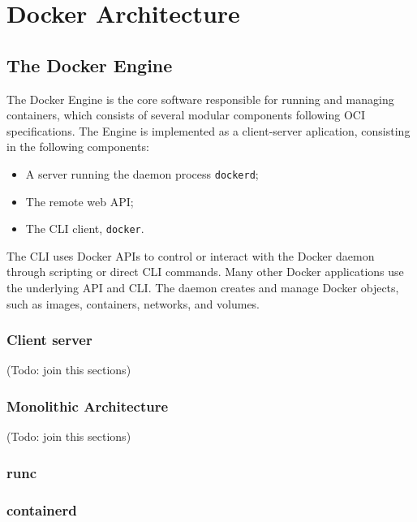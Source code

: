 \section{Docker Architecture}
\label{sec::arch}


\subsection{The Docker Engine}
\label{sec::arch:engine}
The Docker Engine is the core software responsible for running and managing containers, which consists of several modular components following \ac{OCI} specifications. The Engine is implemented as a client-server aplication, consisting in the following components:

\begin{itemize}
    \item A server running the daemon process \texttt{dockerd};
    \item The remote web \ac{API};
    \item The \ac{CLI} client, \texttt{docker}.
\end{itemize}



The CLI uses Docker APIs to control or interact with the Docker daemon through scripting or direct CLI commands. Many other Docker applications use the underlying API and CLI. The daemon creates and manage Docker objects, such as images, containers, networks, and volumes.

\subsubsection{Client server} (Todo: join this sections)
\subsubsection{Monolithic Architecture} (Todo: join this sections)
\subsubsection{runc}
\subsubsection{containerd}

